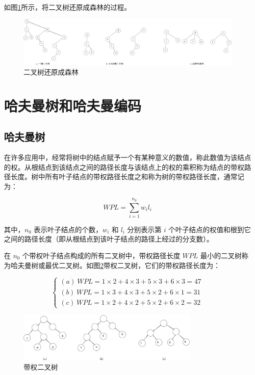 \documentclass[lang=cn,newtx,10pt,scheme=chinese]{../elegantbook}
\begin{document}
如图\ref{fig:BiTree2Forest}所示，将二叉树还原成森林的过程。

\begin{figure}[!htbp]
  \centering
  \includegraphics[width=1\textwidth]{./figure/pdf/cropped/Btree2Forest.pdf}
  \caption{二叉树还原成森林}
  \label{fig:BiTree2Forest}

\end{figure}
\section{哈夫曼树和哈夫曼编码}

\subsection{哈夫曼树}

在许多应用中，经常将树中的结点赋予一个有某种意义的数值，称此数值为该结点的权。从根结点到该结点之间的路径长度与该结点上的权的乘积称为结点的带权路径长度。树中所有叶子结点的带权路径长度之和称为树的带权路径长度，通常记为：

\[
WPL = \sum_{i=1}^{n_0} w_i l_i
\]

其中，$n_0$ 表示叶子结点的个数，$w_i$ 和 $l_i$ 分别表示第 $i$ 个叶子结点的权值和根到它之间的路径长度（即从根结点到该叶子结点的路径上经过的分支数）。

在 $n_0$ 个带权叶子结点构成的所有二叉树中，带权路径长度 $WPL$ 最小的二叉树称为哈夫曼树或最优二叉树。如图\ref{fig:weightBTree}带权二叉树，它们的带权路径长度为：

\[
\begin{cases}
(a) \ WPL = 1 \times 2 + 4 \times 3 + 5 \times 3 + 6 \times 3 = 47 \\
(b) \ WPL = 1 \times 3 + 4 \times 3 + 5 \times 2 + 6 \times 1 = 31 \\
(c) \ WPL = 1 \times 2 + 4 \times 2 + 5 \times 2 + 6 \times 2 = 32
\end{cases}
\]

\begin{figure}[!htbp]
  
  \centering

  \includegraphics[width=0.8\textwidth]{./figure/pdf/cropped/treeWeight.pdf}
  \caption{带权二叉树}
  \label{fig:weightBTree}
\end{figure}
\end{document}
